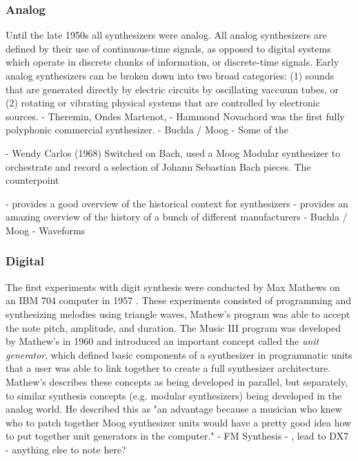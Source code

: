 \subsubsection{Analog}
Until the late 1950s all synthesizers were analog. All analog synthesizers are defined by their use of continuous-time signals, as opposed to digital systems which operate in discrete chunks of information, or discrete-time signals. Early analog synthesizers can be broken down into two broad categories: (1) sounds that are generated directly by electric circuits by oscillating vaccuum tubes, or (2) rotating or vibrating physical systems that are controlled by electronic sources. 
- Theremin, Ondes Martenot,
- Hammond Novachord was the first fully polyphonic commercial synthesizer. 
- Buchla / Moog
- Some of the 

- Wendy Carlos (1968) Switched on Bach, used a Moog Modular synthesizer to orchestrate and record a selection of Johann Sebastian Bach pieces. The counterpoint




- \cite{mcguire2015musical} provides a good overview of the historical context for synthesizers 
- \cite{jenkins2019analog} provides an amazing overview of the history of a bunch of different manufacturers
- Buchla / Moog
- Waveforms

\subsubsection{Digital}
The first experiments with digit synthesis were conducted by Max Mathews on an IBM 704 computer in 1957 \cite{roads1980interview}. These experiments consisted of programming and synthesizing melodies using triangle waves, Mathew's program was able to accept the note pitch, amplitude, and duration. The Music III program was developed by Mathew's in 1960 and introduced an important concept called the \textit{unit generator}, which defined basic components of a synthesizer in programmatic units that a user was able to link together to create a full synthesizer architecture. Mathew's describes these concepts as being developed in parallel, but separately, to similar synthesis concepts (e.g. modular synthesizers) being developed in the analog world. He described this as "an advantage because a musician who knew who to patch together Moog synthesizer units would have a pretty good idea how to put together unit generators in the computer." 
- FM Synthesis - \cite{chowning1973synthesis}, lead to DX7
- anything else to note here?

